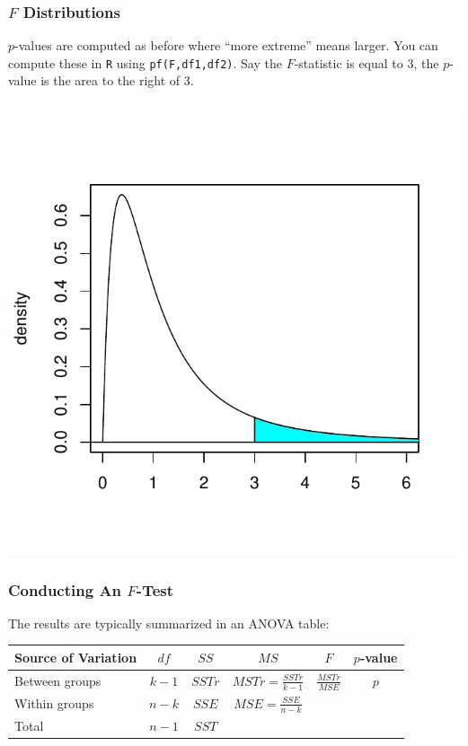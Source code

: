\documentclass[handout]{beamer}
\newcommand{\blue}[1]{\textcolor{blue2}{#1}}
\begin{document}
\begin{frame}
\frametitle{$F$ Distributions}
$p$-values are computed as before where ``more extreme'' means \blue{larger}.  You can compute these in {\tt R} using {\tt pf(F,df1,df2)}.  Say the $F$-statistic is equal to $3$, the $p$-value is the \blue{area to the right of 3}.
\begin{center}
\includegraphics{figure/lec22-010}
\end{center}
\end{frame}


\begin{frame}
\frametitle{Conducting An $F$-Test}
The results are typically summarized in an \blue{ANOVA table}:

\begin{small}
\begin{center}
\begin{tabular}{l|ccc|cc}
Source of Variation & $df$ & $SS$ & $MS$ & $F$ & $p$-value\\
\hline
Between groups & $k-1$ & $SSTr$ & $MSTr = \frac{SSTr}{k-1}$ & $\frac{MSTr}{MSE}$ & $p$\\
Within groups & $n-k$ & $SSE$ & $MSE = \frac{SSE}{n-k}$ & & \\
\hline
Total & $n-1$ & $SST$ &  & & 
\end{tabular}
\end{center}
\end{small}
\end{frame}
\end{document}
